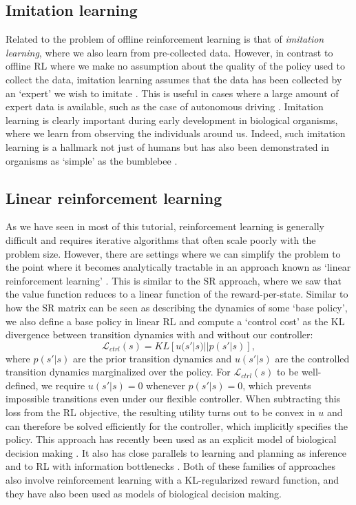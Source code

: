 \subsection{Imitation learning}
\label{sec:imitation}
Related to the problem of offline reinforcement learning is that of \emph{imitation learning}, where we also learn from pre-collected data.
However, in contrast to offline RL where we make no assumption about the quality of the policy used to collect the data, imitation learning assumes that the data has been collected by an `expert' we wish to imitate \citep{levine2020offline}.
This is useful in cases where a large amount of expert data is available, such as the case of autonomous driving \citep{pan2017agile}.
Imitation learning is clearly important during early development in biological organisms, where we learn from observing the individuals around us.
Indeed, such imitation learning is a hallmark not just of humans but has also been demonstrated in organisms as `simple' as the bumblebee \citep{loukola2017bumblebees}.

\subsection{Linear reinforcement learning}
\label{sec:linear_RL}
As we have seen in most of this tutorial, reinforcement learning is generally difficult and requires iterative algorithms that often scale poorly with the problem size.
However, there are settings where we can simplify the problem to the point where it becomes analytically tractable in an approach known as `linear reinforcement learning' \citep{todorov2006linearly, todorov2009efficient}.
This is similar to the SR approach, where we saw that the value function reduces to a linear function of the reward-per-state.
Similar to how the SR matrix can be seen as describing the dynamics of some `base policy', we also define a base policy in linear RL and compute a `control cost' as the KL divergence between transition dynamics with and without our controller:
\begin{equation}
    \mathcal{L}_{ctrl}(s) = KL \left [ u(s' | s) || p(s'|s) \right ],
\end{equation}
where $p(s' | s)$ are the prior transition dynamics and $u(s' | s)$ are the controlled transition dynamics marginalized over the policy.
For $\mathcal{L}_{ctrl}(s)$ to be well-defined, we require $u(s'|s) = 0$ whenever $p(s'|s) = 0$, which prevents impossible transitions even under our flexible controller.
When subtracting this loss from the RL objective, the resulting utility turns out to be convex in $u$ and can therefore be solved efficiently for the controller, which implicitly specifies the policy.
This approach has recently been used as an explicit model of biological decision making \citep{piray2021linear}.
It also has close parallels to learning and planning as inference \citep{levine2018reinforcement, solway2012goal,botvinick2012planning} and to RL with information bottlenecks \citep{lai2021policy}.
Both of these families of approaches also involve reinforcement learning with a KL-regularized reward function, and they have also been used as models of biological decision making.

